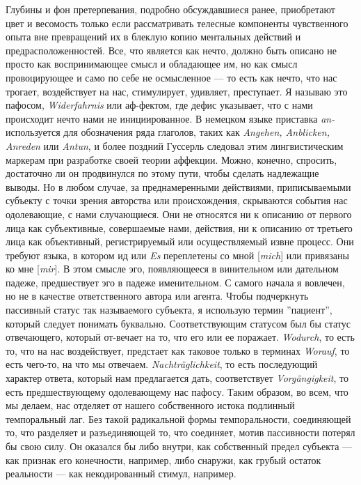 \documentclass[12pt]{book}
\begin{document}
Глубины и фон претерпевания, подробно обсуждавшиеся ранее, приобретают цвет и весомость только если рассматривать телесные компоненты чувственного опыта вне превращений их в блеклую копию ментальных действий и предрасположенностей. Все, что является как нечто, должно быть описано не просто как воспринимающее смысл и обладающее им, но как смысл провоцирующее и само по себе не осмысленное --- то есть как нечто, что нас трогает, воздействует на нас, стимулирует, удивляет, преступает. Я называю это пафосом, \textit{Widerfahrnis} или аф-фектом, где дефис указывает, что с нами происходит нечто нами не инициированное. В немецком языке приставка \textit{an-} используется для обозначения ряда глаголов, таких как \textit{Angehen, Anblicken, Anreden} или \textit{Antun}, и более поздний Гуссерль следовал этим лингвистическим маркерам при разработке своей теории аффекции. Можно, конечно, спросить, достаточно ли он продвинулся по этому пути, чтобы сделать надлежащие выводы. Но в любом случае, за преднамеренными действиями, приписываемыми субъекту с точки зрения авторства или происхождения, скрываются события нас одолевающие, с нами случающиеся. Они не относятся ни к описанию от первого лица как субъективные, совершаемые нами, действия, ни к описанию от третьего лица как объективный, регистрируемый или осуществляемый извне процесс. Они требуют языка, в котором ид или \textit{Es} переплетены со мной [\textit{mich}] или привязаны ко мне [\textit{mir}]. В этом смысле эго, появляющееся в винительном или дательном падеже, предшествует эго в падеже именительном. С самого начала я вовлечен, но не в качестве ответственного автора или агента. Чтобы подчеркнуть пассивный статус так называемого субъекта, я использую термин ''пациент'', который следует понимать буквально. Соответствующим статусом был бы статус отвечающего, который от-вечает на то, что его или ее поражает. \textit{Wodurch}, то есть то, что на нас воздействует, предстает как таковое только в терминах \textit{Worauf}, то есть чего-то, на что мы отвечаем. \textit{Nachträglichkeit}, то есть последующий характер ответа, который нам предлагается дать, соответствует \textit{Vorgängigkeit}, то есть предшествующему одолевающему нас пафосу. Таким образом, во всем, что мы делаем, нас отделяет от нашего собственного истока подлинный темпоральный лаг. Без такой радикальной формы темпоральности, соединяющей то, что разделяет и разъединяющей то, что соединяет, мотив пассивности потерял бы свою силу. Он оказался бы либо внутри, как собственный предел субъекта --- как признак его конечности, например, либо снаружи, как грубый остаток реальности --- как некодированный стимул, например.
\end{document}
